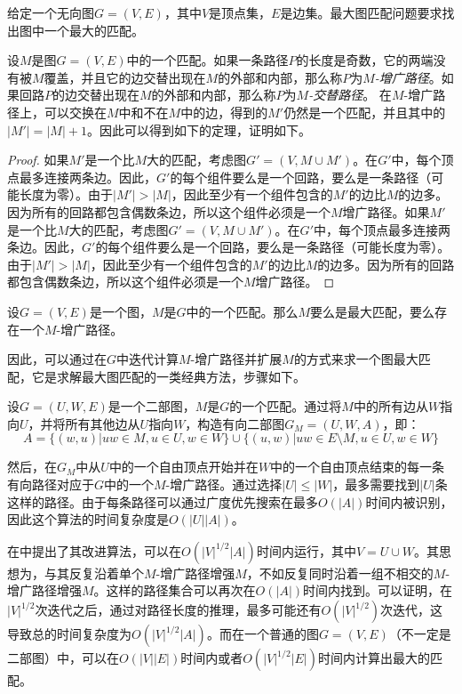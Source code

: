 \begin{definition}
    给定一个无向图$G = (V, E)$，其中$V$是顶点集，$E$是边集。最大图匹配问题要求找出图中一个最大的匹配。
\end{definition}

设$M$是图$G = (V, E)$中的一个匹配。如果一条路径$P$的长度是奇数，它的两端没有被$M$覆盖，并且它的边交替出现在$M$的外部和内部，那么称$P$为\textit{$M$-增广路径}。如果回路$P$的边交替出现在$M$的外部和内部，那么称$P$为\textit{$M$-交替路径}。
在$M$-增广路径上，可以交换在$M$中和不在$M$中的边，得到的$M'$仍然是一个匹配，并且其中的$|M'| = |M| + 1$。因此可以得到如下的定理，证明如下。

\begin{proof}
如果$M'$是一个比$M$大的匹配，考虑图$G' = (V, M \cup M')$。在$G'$中，每个顶点最多连接两条边。因此，$G'$的每个组件要么是一个回路，要么是一条路径（可能长度为零）。由于$|M'| > |M|$，因此至少有一个组件包含的$M'$的边比$M$的边多。因为所有的回路都包含偶数条边，所以这个组件必须是一个$M$增广路径。如果$M'$是一个比$M$大的匹配，考虑图$G' = (V, M \cup M')$。在$G'$中，每个顶点最多连接两条边。因此，$G'$的每个组件要么是一个回路，要么是一条路径（可能长度为零）。由于$|M'| > |M|$，因此至少有一个组件包含的$M'$的边比$M$的边多。因为所有的回路都包含偶数条边，所以这个组件必须是一个$M$增广路径。
\end{proof}

\begin{theorem}
   设$G = (V, E)$是一个图，$M$是$G$中的一个匹配。那么$M$要么是最大匹配，要么存在一个$M$-增广路径。
\end{theorem}

因此，可以通过在$G$中迭代计算$M$-增广路径并扩展$M$的方式来求一个图最大匹配，它是求解最大图匹配的一类经典方法，步骤如下。

设$G = (U, W, E)$是一个二部图，$M$是$G$的一个匹配。通过将$M$中的所有边从$W$指向$U$，并将所有其他边从$U$指向$W$，构造有向二部图$G_M = (U, W, A)$，即：
\begin{equation*}
    A = \{(w, u) | uw \in M, u \in U, w \in W \} \cup \{(u, w) | uw \in E \setminus M, u \in U, w \in W \}
\end{equation*}

然后，在$G_M$中从$U$中的一个自由顶点开始并在$W$中的一个自由顶点结束的每一条有向路径对应于$G$中的一个$M$-增广路径。通过选择$|U| \leq |W|$，最多需要找到$|U|$条这样的路径。由于每条路径可以通过广度优先搜索在最多$O(|A|)$时间内被识别，因此这个算法的时间复杂度是$O(|U||A|)$。

在\cite{hopcroft1973n}中提出了其改进算法，可以在$O(|V|^{1/2}|A|)$时间内运行，其中$V = U \cup W$。其思想为，与其反复沿着单个$M$-增广路径增强$M$，不如反复同时沿着一组不相交的$M$-增广路径增强$M$。这样的路径集合可以再次在$O(|A|)$时间内找到。可以证明，在$|V|^{1/2}$次迭代之后，通过对路径长度的推理，最多可能还有$O(|V|^{1/2})$次迭代，这导致总的时间复杂度为$O(|V|^{1/2}|A|)$。而在一个普通的图$G = (V, E)$（不一定是二部图）中，可以在$O(|V||E|)$时间内\cite{edmonds1965paths}或者$O(|V|^{1/2}|E|)$时间内\cite{micali1980v}计算出最大的匹配。

